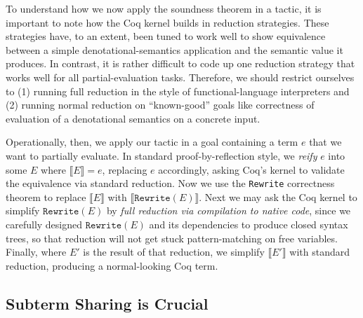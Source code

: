 To understand how we now apply the soundness theorem in a tactic, it is important to note how the Coq kernel builds in reduction strategies.
These strategies have, to an extent, been tuned to work well to show equivalence between a simple denotational-semantics application and the semantic value it produces.
In contrast, it is rather difficult to code up one reduction strategy that works well for all partial-evaluation tasks.
Therefore, we should restrict ourselves to (1) running full reduction in the style of functional-language interpreters and (2) running normal reduction on ``known-good'' goals like correctness of evaluation of a denotational semantics on a concrete input.

Operationally, then, we apply our tactic in a goal containing a term $e$ that we want to partially evaluate.
In standard proof-by-reflection style, we \emph{reify} $e$ into some $E$ where $\llbracket E \rrbracket = e$, replacing $e$ accordingly, asking Coq's kernel to validate the equivalence via standard reduction.
Now we use the \texttt{Rewrite} correctness theorem to replace $\llbracket E \rrbracket$ with $\llbracket \texttt{Rewrite}(E) \rrbracket$.
Next we may ask the Coq kernel to simplify $\texttt{Rewrite}(E)$ by \emph{full reduction via compilation to native code}, since we carefully designed $\texttt{Rewrite}(E)$ and its dependencies to produce closed syntax trees, so that reduction will not get stuck pattern-matching on free variables.
Finally, where $E'$ is the result of that reduction, we simplify $\llbracket E' \rrbracket$ with standard reduction, producing a normal-looking Coq term.


\subsection{Subterm Sharing is Crucial}\label{sec:under-lets}

